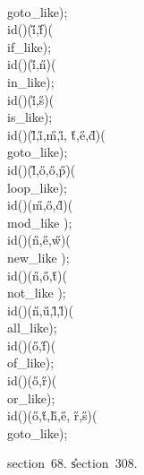\\{goto\_like}\?\2)\?;\6
\\{id}\?\1(\?\2)\1(\?\H{i}\?,\?\H{f}\?\2)\1(\?\\{if\_like}\?\2)\?;\6
\\{id}\?\1(\?\2)\1(\?\H{i}\?,\?\H{n}\?\2)\1(\?\\{in\_like}\?\2)\?;\6
\\{id}\?\1(\?\2)\1(\?\H{i}\?,\?\H{s}\?\2)\1(\?\\{is\_like}\?\2)\?;\6
\\{id}\?\1(\?\2)\1(\?\H{l}\?,\?\H{i}\?,\?\H{m}\?,\?\H{i}\?,\?%
\H{t}\?,\?\H{e}\?,\?\H{d}\?\2)\1(\?\\{goto\_like}\?\2)\?;\6
\\{id}\?\1(\?\2)\1(\?\H{l}\?,\?\H{o}\?,\?\H{o}\?,\?\H{p}\?\2)\1(\?%
\\{loop\_like}\?\2)\?;\6
\\{id}\?\1(\?\2)\1(\?\H{m}\?,\?\H{o}\?,\?\H{d}\?\2)\1(\?\\{mod\_like}%
\?\2)\?;\6
\\{id}\?\1(\?\2)\1(\?\H{n}\?,\?\H{e}\?,\?\H{w}\?\2)\1(\?\\{new\_like}%
\?\2)\?;\6
\\{id}\?\1(\?\2)\1(\?\H{n}\?,\?\H{o}\?,\?\H{t}\?\2)\1(\?\\{not\_like}%
\?\2)\?;\6
\\{id}\?\1(\?\2)\1(\?\H{n}\?,\?\H{u}\?,\?\H{l}\?,\?\H{l}\?\2)\1(\?%
\\{all\_like}\?\2)\?;\6
\\{id}\?\1(\?\2)\1(\?\H{o}\?,\?\H{f}\?\2)\1(\?\\{of\_like}\?\2)\?;\6
\\{id}\?\1(\?\2)\1(\?\H{o}\?,\?\H{r}\?\2)\1(\?\\{or\_like}\?\2)\?;\6
\\{id}\?\1(\?\2)\1(\?\H{o}\?,\?\H{t}\?,\?\H{h}\?,\?\H{e}\?,\?%
\H{r}\?,\?\H{s}\?\2)\1(\?\\{goto\_like}\?\2)\?;\par
\A section~68.
\U section~308\*.\fi

